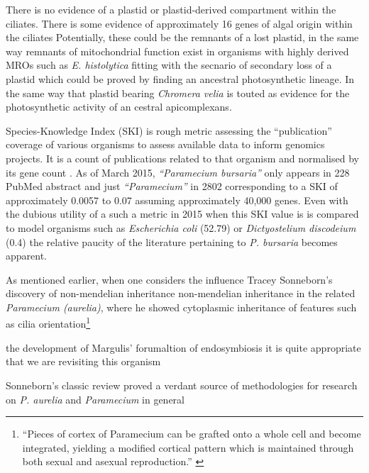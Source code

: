 There is no evidence of a plastid or plastid-derived compartment within the ciliates.
There is some evidence of approximately 16 genes of algal origin within the ciliates 
Potentially, these could be the remnants of a lost plastid, in the same way remnants of mitochondrial function 
exist in organisms with highly derived MROs such as \textit{E. histolytica} fitting with the secnario of
secondary loss of a plastid which could be proved by finding an ancestral photosynthetic lineage.
In the same way that plastid bearing \textit{Chromera velia} is touted as evidence for the photosynthetic activity
of an cestral apicomplexans. \citep{Reyes-Prieto2008}






\citep{Corliss1974} 

Species-Knowledge Index (SKI) is rough metric assessing the ``publication''
coverage of various organisms to assess available data to inform genomics projects.
It is a count of publications related to that organism and normalised by its gene
count \citep{Janssen2005}. As of March 2015, \textit{``Paramecium bursaria''} only appears
in 228 PubMed abstract and just \textit{``Paramecium''} in 2802 corresponding to a
SKI of approximately 0.0057 to 0.07 assuming approximately 40,000 genes.  Even with the
dubious utility of a such a metric in 2015 when this SKI value is 
is compared to model organisms such as \textit{Escherichia coli} (52.79) or 
\textit{Dictyostelium discodeium} (0.4) the relative paucity of the literature
pertaining to \textit{P. bursaria} becomes apparent.







As mentioned earlier, when one considers the influence Tracey Sonneborn's discovery of non-mendelian
inheritance non-mendelian inheritance in the related \textit{Paramecium (aurelia)}, where he showed
cytoplasmic inheritance of features such as cilia orientation\footnote{``Pieces of cortex of Paramecium can be grafted onto a whole cell and
become integrated, yielding a modified cortical pattern which is maintained through both sexual and asexual reproduction.'' \citep{Beisson1965}}

the development of Margulis' forumaltion of endosymbiosis \citep{Margulis1998} it is
quite appropriate that we are revisiting this organism

Sonneborn's classic review \citep{Sonneborn1950} proved a verdant source of methodologies
for research on  \textit{P. aurelia} and \textit{Paramecium} in general






